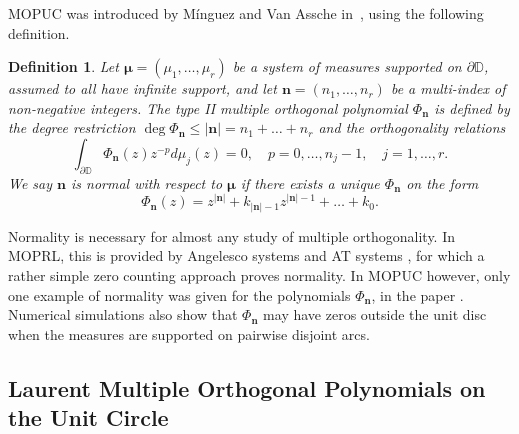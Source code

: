 \documentclass[reqno,centertags,11pt,draft]{amsart}
\newtheorem{defn}[thm]{Definition}
\newcommand{\T}{\mathbb{\partial\mathbb{D}}}
\newcommand{\D}{\mathbb{D}}
\renewcommand{\d}{\partial}
\newcommand{\abs}[1]{\left|#1\right|}
\begin{document}
MOPUC was introduced by M\'{i}nguez and Van Assche in~\cite{MOPUC1}, using the following definition. 
\begin{defn}\label{def:normal A}
Let $\bm{\mu} = (\mu_1,\ldots,\mu_r)$ be a system of measures supported on $\d\D$, assumed to all have infinite support, and let $\bm{n} = (n_1,\dots,n_r)$ be a multi-index of non-negative integers. The type II multiple orthogonal polynomial $\Phi_{\bm{n}}$ is defined by the degree restriction $\deg{\Phi_{\bm{n}}} \leq \abs{\bm{n}} = n_1+\dots+n_r$ and the orthogonality relations 
\begin{equation}\label{eq:type II def A}
    \int_\T \Phi_{\bm{n}}(z)z^{-p}d\mu_j(z) = 0, \quad p = 0,\ldots,n_j-1, \quad j = 1,\dots,r.
\end{equation}
We say $\bm{n}$ is normal with respect to $\bm{\mu}$ if there exists a unique $\Phi_{\bm{n}}$ on the form
\begin{equation}\label{eq:monic polyomials def A}
    \Phi_{\bm{n}}(z) = z^{\abs{\bm{n}}} + k_{\abs{\bm{n}}-1}z^{\abs{\bm{n}}-1}+\ldots+k_{0}.
\end{equation}
\end{defn}

Normality is necessary for almost any study of multiple orthogonality. In MOPRL, this is provided by Angelesco systems and AT systems \cite{bookNS}, for which a rather simple zero counting approach proves normality. In MOPUC however, only one example of normality was given for the polynomials $\Phi_{\bm{n}}$, in the paper \cite{MOPUC2}. Numerical simulations also show that $\Phi_{\bm{n}}$ may have zeros outside the unit disc when the measures are supported on pairwise disjoint arcs. 

\subsection{Laurent Multiple Orthogonal Polynomials on the Unit Circle}
\end{document}
